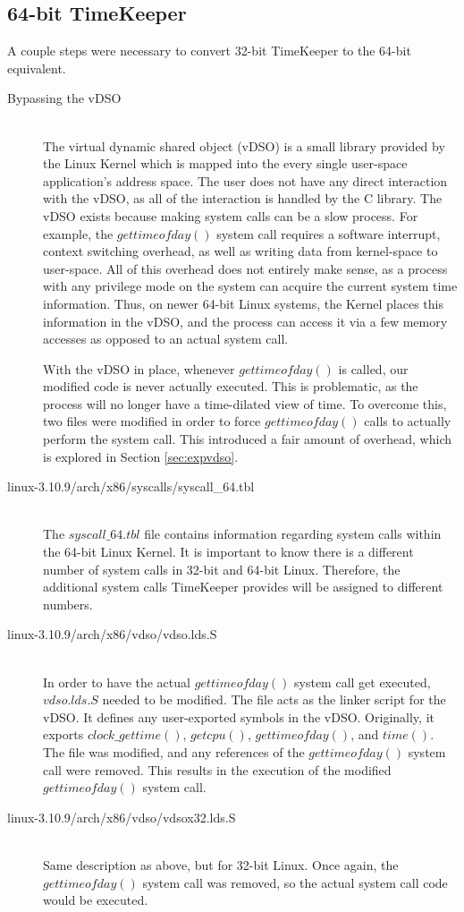 \subsection{64-bit TimeKeeper}
\label{subsec:vdso}
A couple steps were necessary to convert 32-bit TimeKeeper to the 64-bit equivalent. 
\begin{description} 
\item[Bypassing the vDSO] \hfill \\
        The virtual dynamic shared object (vDSO) is a small library provided by the Linux Kernel which is mapped into the every single user-space application's address space. The user does not have any direct interaction with the vDSO, as all of the interaction is handled by the C library. The vDSO exists because making system calls can be a slow process. For example, the $gettimeofday()$ system call requires a software interrupt, context switching overhead, as well as writing data from kernel-space to user-space. All of this overhead does not entirely make sense, as a process with any privilege mode on the system can acquire the current system time information. Thus, on newer 64-bit Linux systems, the Kernel places this information in the vDSO, and the process can access it via a few memory accesses as opposed to an actual system call. 

With the vDSO in place, whenever $gettimeofday()$ is called, our modified code is never actually executed. This is problematic, as the process will no longer have a time-dilated view of time. To overcome this, two files were modified in order to force $gettimeofday()$ calls to actually perform the system call. This introduced a fair amount of overhead, which is explored in Section \ref{sec:expvdso}.
\item[linux-3.10.9/arch/x86/syscalls/syscall\_64.tbl] \hfill \\
The $syscall\_64.tbl$ file contains information regarding system calls within the 64-bit Linux Kernel. It is important to know there is a different number of system calls in 32-bit and 64-bit Linux. Therefore,   the additional system calls TimeKeeper provides will be assigned to different numbers. 
\item[linux-3.10.9/arch/x86/vdso/vdso.lds.S] \hfill \\
        In order to have the actual $gettimeofday()$ system call get executed, $vdso.lds.S$ needed to be modified. The file acts as the linker script for the vDSO. It defines any user-exported symbols in the vDSO. Originally, it exports $clock\_gettime()$, $getcpu()$, $gettimeofday()$, and $time()$. The file was modified, and any references of the $gettimeofday()$ system call were removed. This results in the execution of the modified $gettimeofday()$ system call.
\item[linux-3.10.9/arch/x86/vdso/vdsox32.lds.S] \hfill \\
        Same description as above, but for 32-bit Linux. Once again, the $gettimeofday()$ system call was removed, so the actual system call code would be executed.
\end{description}
